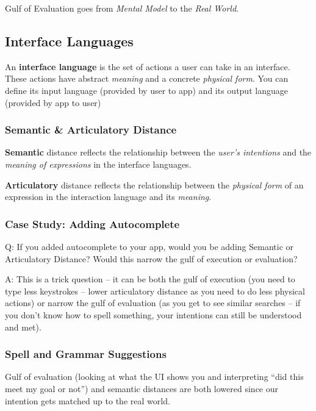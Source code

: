 \begin{shaded}
    Gulf of Evaluation goes from  \textit{Mental Model} to the \textit{Real World}.
\end{shaded}

\subsection{Interface Languages}
\begin{shaded}
    An \textbf{interface language} is the set of actions a user can take in an 
interface. These actions have abstract \textit{meaning} and a concrete \textit{physical 
form}.  You can define its input language (provided by user to app) and 
its output language (provided by app to user)
\end{shaded}

\subsubsection{Semantic \& Articulatory Distance}
\begin{shaded}
\textbf{Semantic} distance reflects the relationship between the \textit{user’s 
intentions} and the \textit{meaning of expressions} in the interface languages.

\textbf{Articulatory} distance reflects the relationship between the \textit{physical 
form} of an expression in the interaction language and its \textit{meaning}.
\end{shaded}

\subsubsection{Case Study: Adding Autocomplete}
Q: If you added autocomplete to your app, would you be adding Semantic or Articulatory Distance? Would this narrow the gulf of execution or evaluation?

A: This is a trick question -- it can be both the gulf of execution (you need to type less keystrokes -- lower articulatory distance as you need to do less physical actions) or narrow the gulf of evaluation (as you get to see similar searches -- if you don't know how to spell something, your intentions can still be understood and met).

\subsubsection{Spell and Grammar Suggestions}
Gulf of evaluation (looking at what the UI shows you and interpreting ``did this meet my goal or not'') and semantic distances are both lowered since our intention gets matched up to the real world.

